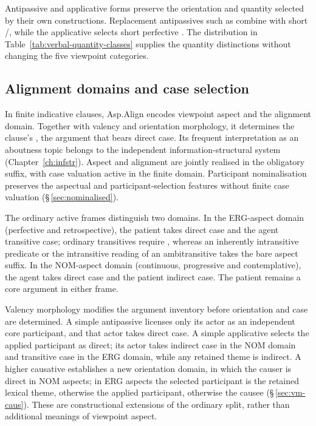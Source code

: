 Antipassive and applicative forms preserve the orientation and quantity
selected by their own constructions. Replacement antipassives such as
 combine with short /, while the
applicative  selects short perfective .
The distribution in Table~\ref{tab:verbal-quantity-classes} supplies the
quantity distinctions without changing the five viewpoint categories.

\subsection{Alignment domains and case selection}
\label{sec:vm-asp-case}

In finite indicative clauses, Asp.Align encodes viewpoint aspect and the
alignment domain. Together with valency and orientation morphology, it
determines the clause's , the argument that bears
direct case. Its frequent interpretation as an
aboutness topic belongs to the independent information-structural system
(Chapter~\ref{ch:infstr}). Aspect and alignment are jointly realised in the obligatory
suffix, with case valuation active in the finite domain. Participant
nominalisation preserves the aspectual and participant-selection features
without finite case valuation (§\,\ref{sec:nominalised}).

The ordinary active frames distinguish two domains. In the ERG-aspect domain
(perfective and retrospective), the patient takes direct case and the agent
transitive case; ordinary transitives require , whereas an
inherently intransitive predicate or the intransitive reading of an
ambitransitive takes the bare aspect suffix. In the NOM-aspect domain
(continuous, progressive and contemplative), the agent takes direct case and
the patient indirect case. The patient remains a core argument in either frame.

Valency morphology modifies the argument inventory before orientation and case
are determined. A simple antipassive licenses only its actor as an independent
core participant, and that actor takes direct case. A simple applicative
selects the applied participant as direct; its actor takes indirect case in the
NOM domain and transitive case in the ERG domain, while any retained theme is
indirect. A higher causative establishes a new orientation domain, in which the
causer is direct in NOM aspects; in ERG aspects the selected participant is the
retained lexical theme, otherwise the applied participant, otherwise the
causee (§\,\ref{sec:vm-caus}). These are constructional extensions of the
ordinary split, rather than additional meanings of viewpoint aspect.

